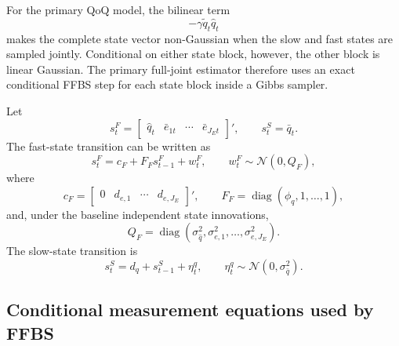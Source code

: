 \documentclass[11pt]{article}
\newcommand{\Normal}{\mathcal{N}}
\begin{document}
For the primary QoQ model, the bilinear term
\begin{equation}
-\gamma\tilde q_t\hat q_t
\end{equation}
makes the complete state vector non-Gaussian when the slow and fast states are sampled jointly. Conditional on either state block, however, the other block is linear Gaussian. The primary full-joint estimator therefore uses an exact conditional FFBS step for each state block inside a Gibbs sampler.

Let
\begin{equation}
s_t^F=
\begin{bmatrix}
\hat q_t & \bar e_{1t} & \cdots & \bar e_{J_Et}
\end{bmatrix}',
\qquad
s_t^S=\bar q_t.
\end{equation}
The fast-state transition can be written as
\begin{equation}
s_t^F=c_F+F_Fs_{t-1}^F+w_t^F,
\qquad
w_t^F\sim\Normal(0,Q_F),
\end{equation}
where
\begin{equation}
c_F=
\begin{bmatrix}
0 & d_{e,1} & \cdots & d_{e,J_E}
\end{bmatrix}',
\qquad
F_F=\operatorname{diag}(\phi_q,1,\ldots,1),
\end{equation}
and, under the baseline independent state innovations,
\begin{equation}
Q_F=\operatorname{diag}
\left(
\sigma_{\hat q}^2,
\sigma_{e,1}^2,
\ldots,
\sigma_{e,J_E}^2
\right).
\end{equation}
The slow-state transition is
\begin{equation}
s_t^S=d_q+s_{t-1}^S+\eta_t^q,
\qquad
\eta_t^q\sim\Normal(0,\sigma_{\bar q}^2).
\end{equation}

\subsection{Conditional measurement equations used by FFBS}
\end{document}
